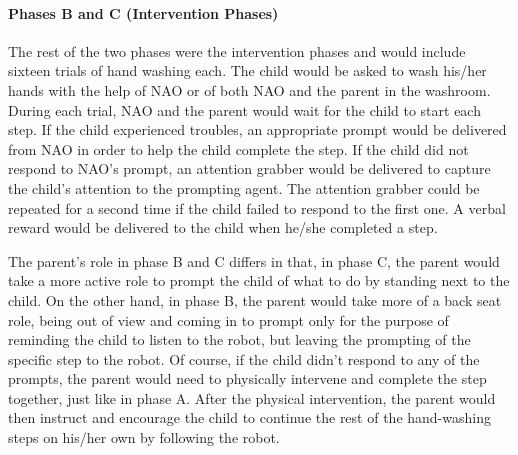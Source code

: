 \paragraph{Phases B and C (Intervention Phases)}
The rest of the two phases were the intervention phases and would include sixteen trials of hand washing each. The child would be asked to wash his/her hands with the help of NAO or of both NAO and the parent in the washroom. During each trial, NAO and the parent would wait for the child to start each step. If the child experienced troubles, an appropriate prompt would be delivered from NAO in order to help the child complete the step. If the child did not respond to NAO's prompt, an attention grabber would be delivered to capture the child's attention to the prompting agent. The attention grabber could be repeated for a second time if the child failed to respond to the first one.  A verbal reward would be delivered to the child when he/she completed a step.

The parent's role in phase B and C differs in that, in phase C, the parent would take a more active role to prompt the child of what to do by standing next to the child.  On the other hand, in phase B, the parent would take more of a back seat role, being out of view and coming in to prompt only for the purpose of reminding the child to listen to the robot, but leaving the prompting of the specific step to the robot.  Of course, if the child didn't respond to any of the prompts, the parent would need to physically intervene and complete the step together, just like in phase A.  After the physical intervention, the parent would then instruct and encourage the child to continue the rest of the hand-washing steps on his/her own by following the robot.

